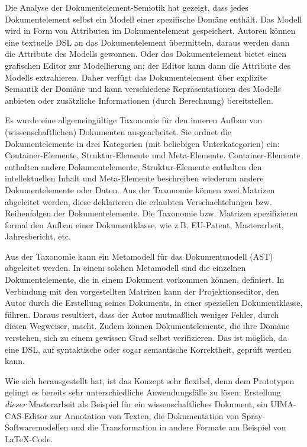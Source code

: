  
Die Analyse der Dokumentelement-Semiotik hat gezeigt, dass jedes Dokumentelement selbst ein Modell einer spezifische Domäne enthält. Das Modell wird in Form von Attributen im Dokumentelement gespeichert. Autoren können eine textuelle DSL an das Dokumentelement übermitteln, daraus werden dann die Attribute des Modells gewonnen. Oder das Dokumentelement bietet einen grafischen Editor zur Modellierung an; der Editor kann dann die Attribute des Modells extrahieren. Daher verfügt das Dokumentelement über explizite Semantik der Domäne und kann verschiedene Repräsentationen des Modells anbieten oder zusätzliche Informationen (durch Berechnung) bereitstellen.

 
Es wurde eine allgemeingültige Taxonomie für den inneren Aufbau von (wissenschaftlichen) Dokumenten ausgearbeitet. Sie ordnet die Dokumentelemente in drei Kategorien (mit beliebigen Unterkategorien) ein: Container-Elemente, Struktur-Elemente und Meta-Elemente. Container-Elemente enthalten andere Dokumentelemente, Struktur-Elemente enthalten den intellektuellen Inhalt und Meta-Elemente beschreiben wiederum andere Dokumentelemente oder Daten. Aus der Taxonomie können zwei Matrizen abgeleitet werden, diese deklarieren die erlaubten Verschachtelungen bzw. Reihenfolgen der Dokumentelemente. Die Taxonomie bzw. Matrizen spezifizieren formal den Aufbau einer Dokumentklasse, wie z.B. EU-Patent, Masterarbeit, Jahresbericht, etc.

 
Aus der Taxonomie kann ein Metamodell für das Dokumentmodell (AST) abgeleitet werden. In einem solchen Metamodell sind die einzelnen Dokumentelemente, die in einem Dokument vorkommen können, definiert. In Verbindung mit den vorgestellten Matrizen kann der Projektionseditor, den Autor durch die Erstellung seines Dokuments, in einer speziellen Dokumentklasse, führen. Daraus resultiert, dass der Autor mutmaßlich weniger Fehler, durch diesen Wegweiser, macht. Zudem können Dokumentelemente, die ihre Domäne verstehen, sich zu einem gewissen Grad selbst verifizieren. Das ist möglich, da eine DSL, auf syntaktische oder sogar semantische Korrektheit, geprüft werden kann.

 
Wie sich herausgestellt hat, ist das Konzept sehr flexibel, denn dem Prototypen gelingt es bereits sehr unterschiedliche Anwendungsfälle zu lösen: Erstellung \emph{dieser} Masterarbeit als Beispiel für ein wissenschaftliches Dokument, ein UIMA-CAS-Editor zur Annotation von Texten, die Dokumentation von Spray-Softwaremodellen und die Transformation in andere Formate am Beispiel von LaTeX-Code.

